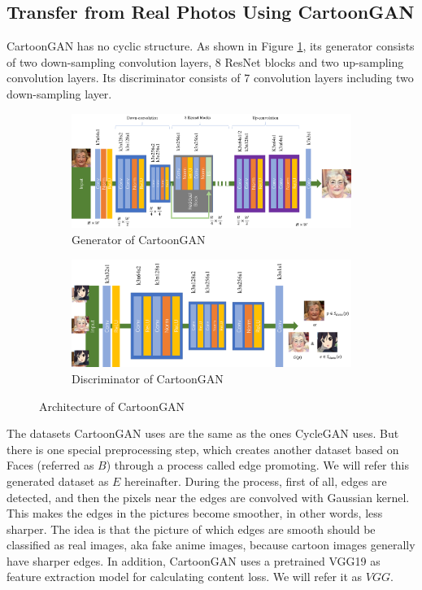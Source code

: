 \documentclass[10pt,twocolumn,letterpaper]{article}
\begin{document}
\subsection{Transfer from Real Photos Using CartoonGAN}

CartoonGAN has no cyclic structure. As shown in Figure
\ref{fig:cartoongan-arch}, its generator consists of two down-sampling
convolution layers, 8 ResNet blocks and two up-sampling convolution layers. Its
discriminator consists of 7 convolution layers including two down-sampling
layer.

\begin{figure}[th]
   \centering
   \begin{subfigure}{\linewidth}
      \centering
      \includegraphics[width=.7\linewidth]{cartoongan-g}
      \caption{Generator of CartoonGAN}
   \end{subfigure}
   \begin{subfigure}{\linewidth}
      \centering
      \includegraphics[width=.7\linewidth]{cartoongan-d}
      \caption{Discriminator of CartoonGAN}
   \end{subfigure}
   \caption{Architecture of CartoonGAN}
   \label{fig:cartoongan-arch}
\end{figure}

The datasets CartoonGAN uses are the same as the ones CycleGAN uses. But there
is one special preprocessing step, which creates another dataset based on Faces
(referred as $B$) through a process called edge promoting. We will refer this
generated dataset as $E$ hereinafter. During the process, first of all, edges
are detected, and then the pixels near the edges are convolved with Gaussian
kernel. This makes the edges in the pictures become smoother, in other words,
less sharper. The idea is that the picture of which edges are smooth should be
classified as real images, aka fake anime images, because cartoon images
generally have sharper edges. In addition, CartoonGAN uses a pretrained VGG19 as
feature extraction model for calculating content loss. We will refer it as
$VGG$.
\end{document}
